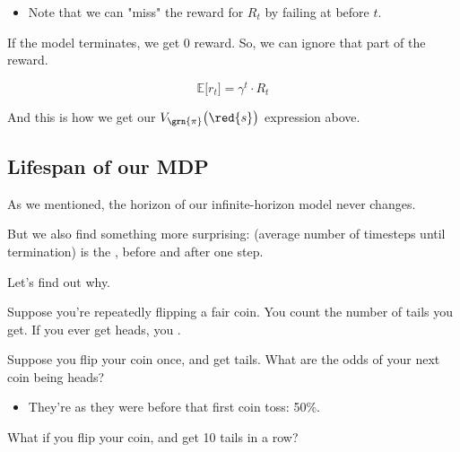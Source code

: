         \begin{itemize}
            \item Note that we can "miss" the reward for $R_t$ by failing at  before $t$. 
        \end{itemize}

        If the model terminates, we get 0 reward. So, we can ignore that part of the reward.

        \begin{equation}
            \mathbb{E}\Big[ r_t  \Big] = 
            \gamma^t \cdot R_t
        \end{equation}

        And this is how we get our $V_{\grn{\pi}}\big(\red{s} \big)$ expression above.

    \phantom{}

    \subsection{Lifespan of our MDP}

        As we mentioned, the horizon of our infinite-horizon model never changes.

        But we also find something more surprising:  (average number of timesteps until termination) is the , before and after one step.

        Let's find out why.

        \subsecdiv

        \miniex Suppose you're repeatedly flipping a fair coin. You count the number of tails you get. If you ever get heads, you .

        Suppose you flip your coin once, and get tails. What are the odds of your next coin being heads?

        \begin{itemize}
            \item They're  as they were before that first coin toss: 50\%.
        \end{itemize}

        What if you flip your coin, and get 10 tails in a row?

